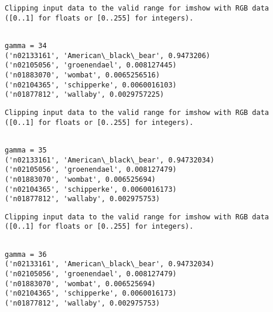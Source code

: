 \documentclass[11pt]{article}
\begin{document}
    \begin{Verbatim}[commandchars=\\\{\}]
Clipping input data to the valid range for imshow with RGB data ([0..1] for floats or [0..255] for integers).

    \end{Verbatim}

    \begin{Verbatim}[commandchars=\\\{\}]

gamma = 34
('n02133161', 'American\_black\_bear', 0.9473206)
('n02105056', 'groenendael', 0.008127445)
('n01883070', 'wombat', 0.0065256516)
('n02104365', 'schipperke', 0.0060016103)
('n01877812', 'wallaby', 0.0029757225)

    \end{Verbatim}

    \begin{Verbatim}[commandchars=\\\{\}]
Clipping input data to the valid range for imshow with RGB data ([0..1] for floats or [0..255] for integers).

    \end{Verbatim}

    \begin{Verbatim}[commandchars=\\\{\}]

gamma = 35
('n02133161', 'American\_black\_bear', 0.94732034)
('n02105056', 'groenendael', 0.008127479)
('n01883070', 'wombat', 0.006525694)
('n02104365', 'schipperke', 0.0060016173)
('n01877812', 'wallaby', 0.002975753)

    \end{Verbatim}

    \begin{Verbatim}[commandchars=\\\{\}]
Clipping input data to the valid range for imshow with RGB data ([0..1] for floats or [0..255] for integers).

    \end{Verbatim}

    \begin{Verbatim}[commandchars=\\\{\}]

gamma = 36
('n02133161', 'American\_black\_bear', 0.94732034)
('n02105056', 'groenendael', 0.008127479)
('n01883070', 'wombat', 0.006525694)
('n02104365', 'schipperke', 0.0060016173)
('n01877812', 'wallaby', 0.002975753)

    \end{Verbatim}
\end{document}

